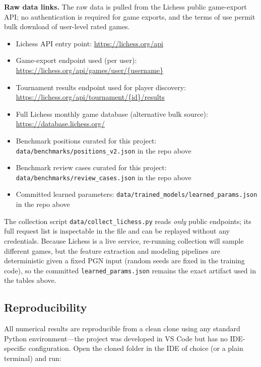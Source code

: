 \documentclass[11pt]{article}
\begin{document}
\textbf{Raw data links.} The raw data is pulled from the Lichess public game-export API; no authentication is required for game exports, and the terms of use permit bulk download of user-level rated games.
\begin{itemize}[leftmargin=*,topsep=0pt,itemsep=1pt]
\item Lichess API entry point: \url{https://lichess.org/api}
\item Game-export endpoint used (per user): \url{https://lichess.org/api/games/user/{username}}
\item Tournament results endpoint used for player discovery: \url{https://lichess.org/api/tournament/{id}/results}
\item Full Lichess monthly game database (alternative bulk source): \url{https://database.lichess.org/}
\item Benchmark positions curated for this project: \texttt{data/benchmarks/positions\_v2.json} in the repo above
\item Benchmark review cases curated for this project: \texttt{data/benchmarks/review\_cases.json} in the repo above
\item Committed learned parameters: \texttt{data/trained\_models/learned\_params.json} in the repo above
\end{itemize}

The collection script \texttt{data/collect\_lichess.py} reads \emph{only} public endpoints; its full request list is inspectable in the file and can be replayed without any credentials. Because Lichess is a live service, re-running collection will sample different games, but the feature extraction and modeling pipelines are deterministic given a fixed PGN input (random seeds are fixed in the training code), so the committed \texttt{learned\_params.json} remains the exact artifact used in the tables above.

\subsection{Reproducibility}
All numerical results are reproducible from a clean clone using any standard Python environment---the project was developed in VS Code but has no IDE-specific configuration. Open the cloned folder in the IDE of choice (or a plain terminal) and run:
\end{document}
